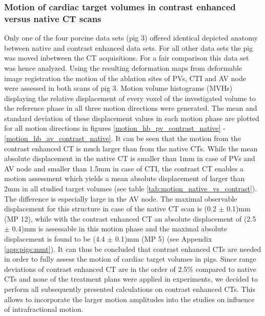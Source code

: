 \subsubsection*{Motion of cardiac target volumes in contrast enhanced versus native CT scans}
Only one of the four porcine data sets (pig 3) offered identical depicted anatomy between native and contrast enhanced data sets. For all 
other data sets the pig was moved inbetween the CT acquisitions. For a fair comparison this data set was hence analyzed. 
Using the resulting deformation maps from deformable image registration the motion of the ablation sites of PVs, CTI and AV node were assessed 
in both scans of pig 3. Motion volume histograms (MVHs) \cite{Ric13} displaying the relative displacement of every voxel of the investigated 
volume to the reference phase in all three motion directions were generated. The mean and standard deviation of these displacement values in 
each motion phase are plotted for all motion directions in figures \ref{motion_hb_pv_contrast_native} - \ref{motion_hb_av_contrast_native}.
It can be seen that the motion from the contrast enhanced CT is much larger than from the native CTs. While the mean absolute 
displacement in the native CT is smaller than 1mm in case of PVs and AV node and smaller than 1.5mm in case of CTI, the contrast CT enables a 
motion assessment which yields a mean absolute displacement of larger than 2mm in all studied target volumes (see table \ref{tab:motion_native_vs_contrast}). 
The difference is especially large in the AV node. The maximal observable displacement for this structure in case of the native CT scan is 
(0.2 $\pm$ 0.1)mm (MP 12), while with the contrast enhanced CT an absolute displacement of (2.5 $\pm$ 0.4)mm is 
assessable in this motion phase and the maximal absolute displacement is found to be (4.4 $\pm$ 0.1)mm (MP 5) (see Appendix \ref{app:pigs:mmt}). 
It can thus be concluded that contrast enhanced CTs are needed in order to fully assess the motion of cardiac target volumes in pigs. 
Since range deviations of contrast enhanced CT are in the order of 2.5\% compared to native CTs \cite{Wer04} and none of the treatment plans 
were applied in experiments, we decided to perform all subsequently presented calculations on contrast enhanced CTs. This allows to incorporate 
the larger motion amplitudes into the studies on influence of intrafractional motion. 

% 
\vspace*{1cm}

